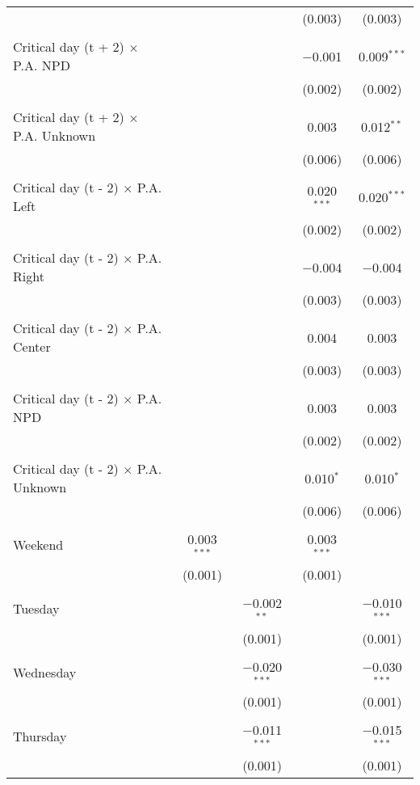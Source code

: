 \documentclass[
]{article}
\begin{document}
\begin{table}[!htbp]
{\begin{tabular}{@{\extracolsep{5pt}}lcccc}
  &  &  & (0.003) & (0.003) \\ 
  & & & & \\ 
 Critical day (t + 2) $\times$ P.A. NPD &  &  & $-$0.001 & 0.009$^{***}$ \\ 
  &  &  & (0.002) & (0.002) \\ 
  & & & & \\ 
 Critical day (t + 2) $\times$ P.A. Unknown &  &  & 0.003 & 0.012$^{**}$ \\ 
  &  &  & (0.006) & (0.006) \\ 
  & & & & \\ 
 Critical day (t - 2) $\times$ P.A. Left &  &  & 0.020$^{***}$ & 0.020$^{***}$ \\ 
  &  &  & (0.002) & (0.002) \\ 
  & & & & \\ 
 Critical day (t - 2) $\times$ P.A. Right &  &  & $-$0.004 & $-$0.004 \\ 
  &  &  & (0.003) & (0.003) \\ 
  & & & & \\ 
 Critical day (t - 2) $\times$ P.A. Center &  &  & 0.004 & 0.003 \\ 
  &  &  & (0.003) & (0.003) \\ 
  & & & & \\ 
 Critical day (t - 2) $\times$ P.A. NPD &  &  & 0.003 & 0.003 \\ 
  &  &  & (0.002) & (0.002) \\ 
  & & & & \\ 
 Critical day (t - 2) $\times$ P.A. Unknown &  &  & 0.010$^{*}$ & 0.010$^{*}$ \\ 
  &  &  & (0.006) & (0.006) \\ 
  & & & & \\ 
 Weekend & 0.003$^{***}$ &  & 0.003$^{***}$ &  \\ 
  & (0.001) &  & (0.001) &  \\ 
  & & & & \\ 
 Tuesday &  & $-$0.002$^{**}$ &  & $-$0.010$^{***}$ \\ 
  &  & (0.001) &  & (0.001) \\ 
  & & & & \\ 
 Wednesday &  & $-$0.020$^{***}$ &  & $-$0.030$^{***}$ \\ 
  &  & (0.001) &  & (0.001) \\ 
  & & & & \\ 
 Thursday &  & $-$0.011$^{***}$ &  & $-$0.015$^{***}$ \\ 
  &  & (0.001) &  & (0.001) \\ 

\end{tabular}}
\end{table}
\end{document}
